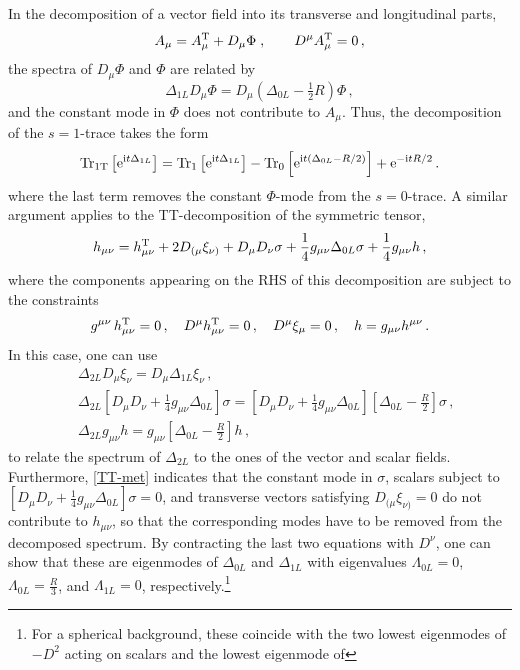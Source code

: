 \documentclass[preprint,preprintnumbers,amsmath,amssymb,nofootinbib,APS]{revtex4}
\newcommand{\be}{\begin{equation}}
\newcommand{\ee}{\end{equation}}
\newcommand{\Tr}{{\rm Tr}}
\newcommand{\2}{\sqrt{2\,}}
\newcommand{\I}{\mathrm{i}}
\newcommand{\e}{\mathrm{e}}
\begin{document}
\begin{appendix}
In the decomposition of a vector field into its transverse and longitudinal
parts,
%
\be\label{TT-vec}
A_\mu = A_\mu^{\rm T} + D_\mu \Phi \; , \qquad D^\mu A_\mu^{\rm T} = 0 \, ,
\ee
%
the spectra of $D_\mu \Phi$ and $\Phi$ are related by 
%
\be
\Delta_{1L} D_\mu \Phi = D_\mu (\Delta_{0L} - \tfrac{1}{2} R ) \Phi \, , 
\ee
%
and the constant mode in $\Phi$ does not contribute to $A_\mu$.   
Thus, the decomposition of the $s=1$-trace takes the form 
%
\be\label{h1T}
\Tr_{\rm 1T}\left[ \e^{\I t \D_{1L}} \right] 
= \Tr_{1}\left[ \e^{\I t \D_{1L}} \right]
- \Tr_{0}\left[ \e^{\I t (\D_{0L} - R/2)} \right]
+ \e^{-\I t R/2} \, .  
\ee
%
where the last term removes the constant $\Phi$-mode from the $s=0$-trace. A similar
argument applies to the TT-decomposition of the symmetric tensor,
%
\be \label{TT-met}
h_{\mu\nu} = h_{\mu\nu}^{\rm T} + 2 D_{(\mu} \xi_{\nu)} + D_\mu D_\nu \sigma +\frac{1}{4} g_{\mu\nu} \Delta_{0L} \sigma + \frac{1}{4} g_{\mu\nu} h\,,
\ee
where the components appearing on the RHS of this decomposition are subject to the constraints
%
\be
g^{\mu \nu} \, h_{\mu\nu}^{\rm T} = 0 \, , \quad D^\mu h_{\mu\nu}^{\rm T} = 0
\, , \quad D^\mu \xi_\mu = 0 \, , \quad h = g_{\mu \nu} h^{\mu \nu} \, .
\ee
%
In this case, one can use
%
\be\label{id1}
\begin{split}
& \,\Delta_{2L} D_\mu \xi_\nu  =  D_\mu \Delta_{1L} \xi_\nu\,, \\
& \,\Delta_{2L} \left[ D_\mu D_\nu +\tfrac{1}{4} g_{\mu\nu} \Delta_{0L} \right] \sigma  =  \left[ D_\mu D_\nu +\tfrac{1}{4} g_{\mu\nu} \Delta_{0L} \right] \left[ \Delta_{0L} - \tfrac{R}{2} \right] \sigma  \, , \\
& \, \Delta_{2L} g_{\mu\nu} h  =  g_{\mu\nu}\left[\Delta_{0L} - \tfrac{R}{2}\right] h \, ,
\end{split}
\ee
%
to relate the spectrum of $\Delta_{2L}$ to the ones of the vector and scalar fields. Furthermore,
\eqref{TT-met} indicates that  the constant mode in $\sigma$, 
scalars subject to $\left[D_\mu D_\nu  + \tfrac{1}{4} g_{\mu\nu} \Delta_{0L} \right] \sigma = 0$, 
and transverse vectors satisfying $D_{(\mu} \xi_{\nu)} = 0$ do not
contribute to $h_{\mu\nu}$, so that the corresponding modes have to be removed from 
the decomposed spectrum. By contracting the last two equations with
$D^\nu$, one can show that these are eigenmodes of  $\Delta_{0L}$ and $\Delta_{1L}$
with eigenvalues 
$\Lambda_{0L} = 0$, $\Lambda_{0L} = \frac{R}{3}$, and $\Lambda_{1L} = 0$,
respectively.\footnote{For a spherical background, these coincide with the two lowest eigenmodes of $-D^2$ acting on scalars and the lowest eigenmode of
}
\end{appendix}
\end{document}
